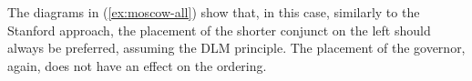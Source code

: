 \vspace{0.5\treeheight}

The diagrams in (\ref{ex:moscow-all}) show that, in this case, similarly to the Stanford approach, the placement of the shorter conjunct on the left should always be preferred, assuming the DLM principle. The placement of the governor, again, does not have an effect on the ordering.


